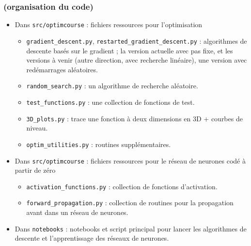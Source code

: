 \documentclass[12pt]{beamer}
\begin{document}
\begin{frame}
\frametitle{(organisation du code)} 
\vspace{-0.4cm}
\begin{itemize}
\small
\item Dans \texttt{src/optimcourse} : fichiers ressources pour l’optimisation 
\begin{itemize}
\small
\item \texttt{gradient\_descent.py}, \texttt{restarted\_gradient\_descent.py} : algorithmes de descente basés sur le gradient ; la version actuelle avec pas fixe, et les versions à venir (autre direction, avec recherche linéaire), une version avec redémarrages aléatoires.
\item \texttt{random\_search.py} : un algorithme de recherche aléatoire.
\item \texttt{test\_functions.py} : une collection de fonctions de test.
\item \texttt{3D\_plots.py} : trace une fonction à deux dimensions en 3D + courbes de niveau.
\item \texttt{optim\_utilities.py} : routines supplémentaires.
\end{itemize}
\item Dans \texttt{src/optimcourse} : fichiers ressources pour le réseau de neurones codé à partir de zéro
\begin{itemize}
\small
\item \texttt{activation\_functions.py} : collection de fonctions d’activation.
\item \texttt{forward\_propagation.py} : collection de routines pour la propagation avant dans un réseau de neurones.
\end{itemize}
\item Dans \texttt{notebooks} : notebooks et script principal pour lancer les algorithmes de descente et l’apprentissage des réseaux de neurones.
\end{itemize}
\end{frame}
\end{document}
